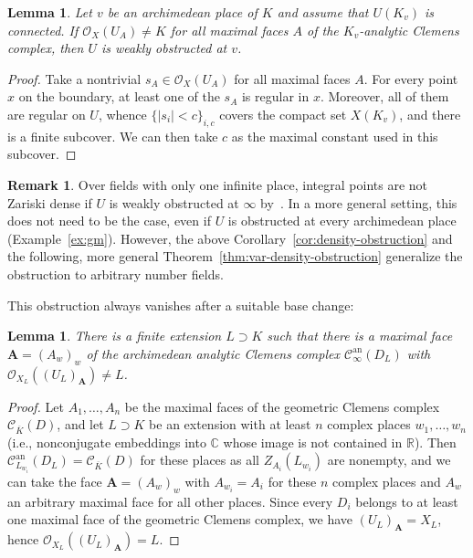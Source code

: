 \documentclass[a4paper, twoside, 10pt]{amsart}
\newcommand{\uA}{{\boldsymbol{A}}}
\newcommand{\cC}{\mathcal{C}}
\newcommand{\cO}{\mathcal{O}}
\newcommand{\CC}{\mathbb{C}}
\newcommand{\RR}{\mathbb{R}}
\newcommand{\Kbar}{{\overline{K}}}
\newcommand{\Can}{\cC^{\mathrm{an}}}
\newcommand{\abs}[1]{\left\lvert#1\right\rvert}
\newtheorem{lemma}[theorem]{Lemma}
\theoremstyle{definition}
\newtheorem{remark}[theorem]{Remark}
\begin{document}
\begin{lemma}\label{lem:face-obs-implies-obs-at-infinity}
  Let $v$ be an archimedean place of $K$ and assume that $U(K_v)$ is connected. If $\cO_X(U_A)\ne K$ for all maximal faces $A$ of the $K_v$-analytic Clemens complex, then $U$ is weakly obstructed at $v$.
\end{lemma}
\begin{proof}
  Take a nontrivial $s_A\in \cO_X(U_A)$ for all maximal faces $A$. For every point $x$ on the boundary, at least one of the $s_A$ is regular in $x$. Moreover, all of them are regular on $U$, whence $\{\abs{s_i}<c\}_{i,c}$ covers the compact set $X(K_v)$, and there is a finite subcover. We can then take $c$ as the maximal constant used in this subcover.
\end{proof}

\begin{remark}
  Over fields with only one infinite place, integral points are not Zariski dense if $U$ is weakly obstructed at $\infty$ by~\cite[Thm.~2.6]{MR3736498}. In a more general setting, this does not need to be the case, even if $U$ is obstructed at every archimedean place (Example~\ref{ex:gm}).
  However, the above Corollary~\ref{cor:density-obstruction} and the following, more general Theorem~\ref{thm:var-density-obstruction} generalize the obstruction to arbitrary number fields.
\end{remark}

This obstruction always vanishes after a suitable base change:

\begin{lemma}\label{lem:obstruction-vanishes}
  There is a finite extension $L\supset K$ such that there is a maximal face $\uA=(A_w)_w$ of the archimedean analytic Clemens complex $\Can_\infty(D_L)$ with $\cO_{X_L}((U_L)_\uA)\ne L$.
\end{lemma}
\begin{proof}
  Let $A_1,\dots,A_n$ be the maximal faces of the geometric Clemens complex $\cC_\Kbar(D)$, and let $L\supset K$ be an extension with at least $n$ complex places $w_1,\dots,w_n$ (i.e., nonconjugate embeddings into $\CC$ whose image is not contained in $\RR$). Then $\Can_{L_{w_i}}(D_L)=\cC_\Kbar(D)$ for these places as all $Z_{A_i}(L_{w_i})$ are nonempty, and we can take the face $\uA=(A_w)_w$ with $A_{w_i}=A_i$ for these $n$ complex places and $A_w$ an arbitrary maximal face for all other places. Since every $D_i$ belongs to at least one maximal face of the geometric Clemens complex, we have $(U_L)_\uA=X_L$, hence $\cO_{X_L}((U_L)_\uA)=L$.
\end{proof}
\end{document}

